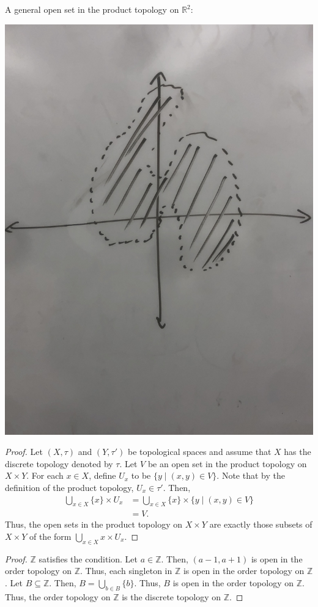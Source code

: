 \documentclass{article}
\newcommand{\Z}{\mathbb Z}
\newcommand{\R}{\mathbb R}
\begin{document}
\begin{center}
A general open set in the product topology on $\R^2$:

\includegraphics[scale=.05]{IMG-0796.jpg}
\end{center}

\newpage{}
\begin{proof}
    Let $(X, \tau)$ and $(Y, \tau')$ be topological spaces and assume that $X$ has the discrete topology denoted by $\tau$.
    Let $V$ be an open set in the product topology on $X \times Y$.
    For each $x \in X$, define $U_x$ to be $\{y \mid (x,y) \in V\}$.
    Note that by the definition of the product topology, $U_x \in \tau'$.
    Then,
    \begin{align*}
        \bigcup_{x \in X}\{x\} \times U_x &= \bigcup_{x \in X}\{x\} \times \{y \mid (x,y) \in V\} \\
                                          &= V.
    \end{align*}
    Thus, the open sets in the product topology on $X \times Y$ are exactly those subsets of $X \times Y$ of the form $\bigcup\limits_{x \in X} x \times U_x$.
\end{proof}

\newpage{}
\begin{proof}
    $\Z$ satisfies the condition.
    Let $a \in \Z$.
    Then, $(a-1,a+1)$ is open in the order topology on $\Z$.
    Thus, each singleton in $\Z$ is open in the order topology on $\Z$.
    Let $B \subseteq \Z$.
    Then, $B = \bigcup\limits_{b \in B} \{b\}$.
    Thus, $B$ is open in the order topology on $\Z$.
    Thus, the order topology on $\Z$ is the discrete topology on $\Z$.
\end{proof}
\end{document}
